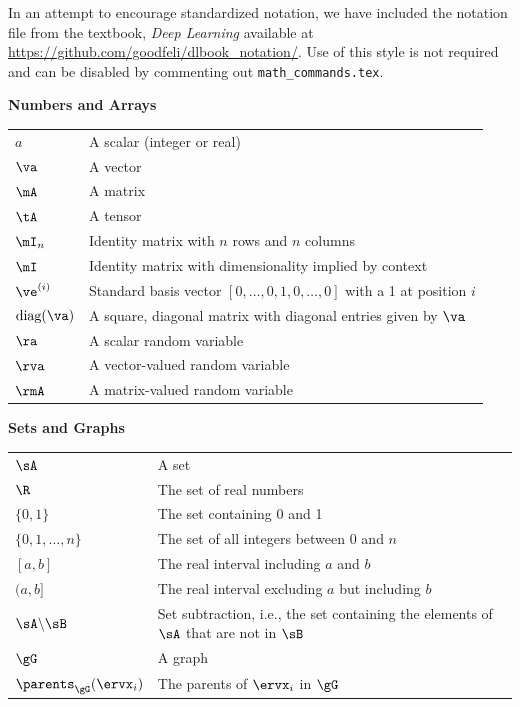 \documentclass{article} %
\begin{document}
In an attempt to encourage standardized notation, we have included the
notation file from the textbook, \textit{Deep Learning}
\cite{goodfellow2016deep} available at
\href{https://github.com/goodfeli/dlbook_notation/}{https://github.com/goodfeli/dlbook\_notation/}.  Use of this style
is not required and can be disabled by commenting out
\texttt{math\_commands.tex}.

\newpage
\centerline{\bf Numbers and Arrays}
\bgroup
\def\arraystretch{1.5}
\begin{tabular}{p{1in}p{3.25in}}
$\displaystyle a$ & A scalar (integer or real)\\
$\displaystyle \va$ & A vector\\
$\displaystyle \mA$ & A matrix\\
$\displaystyle \tA$ & A tensor\\
$\displaystyle \mI_n$ & Identity matrix with $n$ rows and $n$ columns\\
$\displaystyle \mI$ & Identity matrix with dimensionality implied by context\\
$\displaystyle \ve^{(i)}$ & Standard basis vector $[0,\dots,0,1,0,\dots,0]$ with a 1 at position $i$\\
$\displaystyle \text{diag}(\va)$ & A square, diagonal matrix with diagonal entries given by $\va$\\
$\displaystyle \ra$ & A scalar random variable\\
$\displaystyle \rva$ & A vector-valued random variable\\
$\displaystyle \rmA$ & A matrix-valued random variable\\
\end{tabular}
\egroup
\vspace{0.25cm}

\centerline{\bf Sets and Graphs}
\bgroup
\def\arraystretch{1.5}

\begin{tabular}{p{1.25in}p{3.25in}}
$\displaystyle \sA$ & A set\\
$\displaystyle \R$ & The set of real numbers \\
$\displaystyle \{0, 1\}$ & The set containing 0 and 1 \\
$\displaystyle \{0, 1, \dots, n \}$ & The set of all integers between $0$ and $n$\\
$\displaystyle [a, b]$ & The real interval including $a$ and $b$\\
$\displaystyle (a, b]$ & The real interval excluding $a$ but including $b$\\
$\displaystyle \sA \backslash \sB$ & Set subtraction, i.e., the set containing the elements of $\sA$ that are not in $\sB$\\
$\displaystyle \gG$ & A graph\\
$\displaystyle \parents_\gG(\ervx_i)$ & The parents of $\ervx_i$ in $\gG$
\end{tabular}
\vspace{0.25cm}
\end{document}
